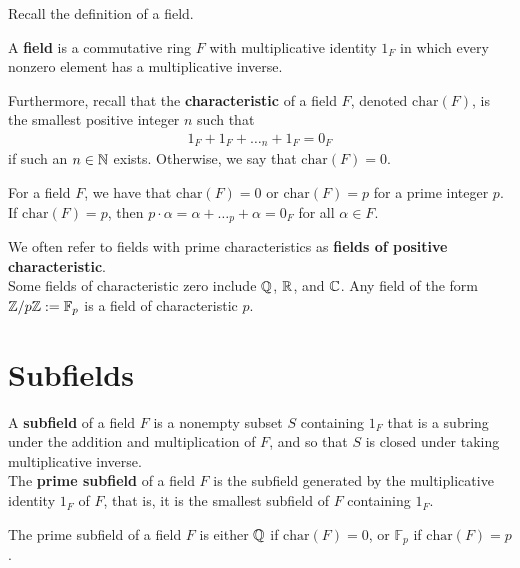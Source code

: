\documentclass{memoir}
\begin{document}


Recall the definition of a field.
\begin{defn}
	A \textbf{field} is a commutative ring \(F\) with multiplicative identity \(1_F\) in which every nonzero element has a multiplicative inverse.
\end{defn}
Furthermore, recall that the \textbf{characteristic} of a field \(F\), denoted \(\textrm{char}(F)\), is the smallest positive integer \(n\) such that
\begin{align*}
	1_F + 1_F + \ldots_n + 1_F = 0_F
\end{align*}
if such an \(n \in \mathbb{N}\) exists. Otherwise, we say that \(\textrm{char}(F)=0\).

\begin{prop}
	For a field \(F\), we have that \(\textrm{char}(F)=0\) or \(\textrm{char}(F) = p\) for a prime integer \(p\). If \(\textrm{char}(F) = p\), then \(p\cdot \alpha  = \alpha + \ldots_p + \alpha  = 0_F\) for all \(\alpha  \in F\).
\end{prop}
We often refer to fields with prime characteristics as \textbf{fields of positive characteristic}.\\

Some fields of characteristic zero include \(\mathbb{Q}\), \(\mathbb{R}\), and \(\mathbb{C}\). Any field of the form \(\mathbb{Z} / p\mathbb{Z} := \mathbb{F}_p\) is a field of characteristic \(p\).

\section{Subfields}
\label{sec:subfields}

\begin{defn}
	A \textbf{subfield} of a field \(F\) is a nonempty subset \(S\) containing \(1_F\) that is a subring under the addition and multiplication of \(F\), and so that \(S\) is closed under taking multiplicative inverse.\\

	The \textbf{prime subfield} of a field \(F\) is the subfield generated by the multiplicative identity \(1_F\) of \(F\), that is, it is the smallest subfield of \(F\) containing \(1_F\).
\end{defn}

\begin{prop}
	The prime subfield of a field \(F\) is either \(\mathbb{Q}\) if \(\textrm{char}(F) = 0\), or \(\mathbb{F}_p\) if \(\textrm{char}(F) = p\).
\end{prop}
\end{document}
